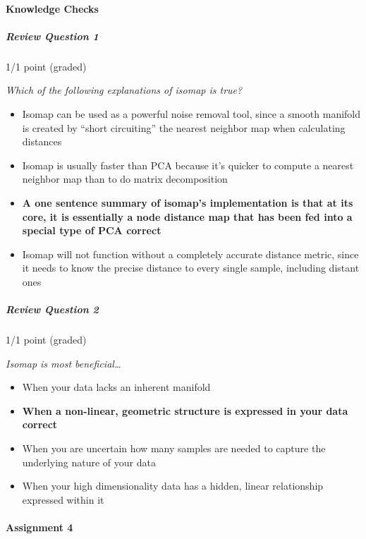 \documentclass[11pt]{article}
\providecommand{\tightlist}{%
      \setlength{\itemsep}{0pt}\setlength{\parskip}{0pt}}
\begin{document}
\hypertarget{knowledge-checks}{%
\paragraph{Knowledge Checks}\label{knowledge-checks}}

\hypertarget{review-question-1}{%
\subparagraph{Review Question 1}\label{review-question-1}}

1/1 point (graded)

\emph{Which of the following explanations of isomap is true?}

\begin{itemize}
\item
  Isomap can be used as a powerful noise removal tool, since a smooth
  manifold is created by ``short circuiting'' the nearest neighbor map
  when calculating distances
\item
  Isomap is usually faster than PCA because it's quicker to compute a
  nearest neighbor map than to do matrix decomposition
\item
  \textbf{A one sentence summary of isomap's implementation is that at
  its core, it is essentially a node distance map that has been fed into
  a special type of PCA correct}
\item
  Isomap will not function without a completely accurate distance
  metric, since it needs to know the precise distance to every single
  sample, including distant ones
\end{itemize}

\hypertarget{review-question-2}{%
\subparagraph{Review Question 2}\label{review-question-2}}

1/1 point (graded)

\emph{Isomap is most beneficial\ldots{}}

\begin{itemize}
\tightlist
\item
  When your data lacks an inherent manifold
\item
  \textbf{When a non-linear, geometric structure is expressed in your
  data correct}
\item
  When you are uncertain how many samples are needed to capture the
  underlying nature of your data
\item
  When your high dimensionality data has a hidden, linear relationship
  expressed within it
\end{itemize}

\hypertarget{assignment-4}{%
\paragraph{Assignment 4}\label{assignment-4}}
\end{document}
